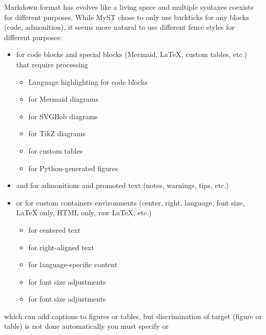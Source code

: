 \documentclass[a4paper,twoside]{article}
\begin{document}
Markdown format has evolves like a living spece and multiple syntaxes coexists for different purposes. While MyST chose to only use backticks for any blocks (code, admonition), it seems more natural to use different fence styles for different purposes:
\begin{itemize}
\item {} for code blocks and special blocks (Mermaid, \LaTeX{}, custom tables, etc.) that require processing
\begin{itemize}
\item {} Language highlighting for code blocks
\item {} for Mermaid diagrams
\item {} for SVGBob diagrams
\item {} for TikZ diagrams
\item {} for custom tables
\item {} for Python-generated figures
\end{itemize}
\item \tscodeinline{!!!} and  for admonitions and promoted text (notes, warnings, tips, etc.)
\item \tscodeinline{:::} or \tscodeinline{///} for custom containers environments (center, right, language, font size, \LaTeX{} only, HTML only, raw \LaTeX{}, etc.)
\begin{itemize}
\item {} for centered text
\item {} for right-aligned text
\item {} for language-specific content
\item {} for font size adjustments
\item {} for font size adjustments
\end{itemize}
\end{itemize}
which can add captions to figures or tables, but discrimination of target (figure or table) is
not done automatically you must specify  or 
\end{document}

